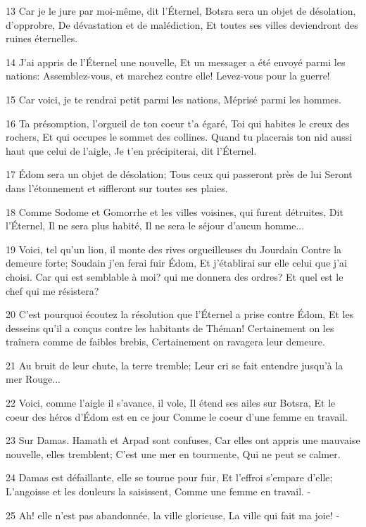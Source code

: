 \par 13 Car je le jure par moi-même, dit l'Éternel, Botsra sera un objet de désolation, d'opprobre, De dévastation et de malédiction, Et toutes ses villes deviendront des ruines éternelles.
\par 14 J'ai appris de l'Éternel une nouvelle, Et un messager a été envoyé parmi les nations: Assemblez-vous, et marchez contre elle! Levez-vous pour la guerre!
\par 15 Car voici, je te rendrai petit parmi les nations, Méprisé parmi les hommes.
\par 16 Ta présomption, l'orgueil de ton coeur t'a égaré, Toi qui habites le creux des rochers, Et qui occupes le sommet des collines. Quand tu placerais ton nid aussi haut que celui de l'aigle, Je t'en précipiterai, dit l'Éternel.
\par 17 Édom sera un objet de désolation; Tous ceux qui passeront près de lui Seront dans l'étonnement et siffleront sur toutes ses plaies.
\par 18 Comme Sodome et Gomorrhe et les villes voisines, qui furent détruites, Dit l'Éternel, Il ne sera plus habité, Il ne sera le séjour d'aucun homme...
\par 19 Voici, tel qu'un lion, il monte des rives orgueilleuses du Jourdain Contre la demeure forte; Soudain j'en ferai fuir Édom, Et j'établirai sur elle celui que j'ai choisi. Car qui est semblable à moi? qui me donnera des ordres? Et quel est le chef qui me résistera?
\par 20 C'est pourquoi écoutez la résolution que l'Éternel a prise contre Édom, Et les desseins qu'il a conçus contre les habitants de Théman! Certainement on les traînera comme de faibles brebis, Certainement on ravagera leur demeure.
\par 21 Au bruit de leur chute, la terre tremble; Leur cri se fait entendre jusqu'à la mer Rouge...
\par 22 Voici, comme l'aigle il s'avance, il vole, Il étend ses ailes sur Botsra, Et le coeur des héros d'Édom est en ce jour Comme le coeur d'une femme en travail.
\par 23 Sur Damas. Hamath et Arpad sont confuses, Car elles ont appris une mauvaise nouvelle, elles tremblent; C'est une mer en tourmente, Qui ne peut se calmer.
\par 24 Damas est défaillante, elle se tourne pour fuir, Et l'effroi s'empare d'elle; L'angoisse et les douleurs la saisissent, Comme une femme en travail. -
\par 25 Ah! elle n'est pas abandonnée, la ville glorieuse, La ville qui fait ma joie! -
